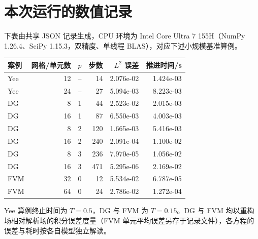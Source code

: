 \section{本次运行的数值记录}
下表由共享 JSON 记录生成，CPU 环境为 Intel Core Ultra 7 155H（NumPy 1.26.4、SciPy 1.15.3，双精度、单线程 BLAS），对应下述小规模基准算例。
\begin{center}\small
\begin{tabular}{lrrrrr}\toprule
案例 & 网格/单元数 & $p$ & 步数 & $L^2$ 误差 & 推进时间/s\\\midrule
Yee & 12 & -- & 14 & 2.076e-02 & 1.424e-03\\
Yee & 24 & -- & 27 & 5.094e-03 & 8.223e-03\\
DG & 8 & 1 & 44 & 2.523e-02 & 2.015e-03\\
DG & 16 & 1 & 87 & 6.550e-03 & 4.003e-03\\
DG & 8 & 2 & 120 & 1.665e-03 & 5.416e-03\\
DG & 16 & 2 & 240 & 2.091e-04 & 1.100e-02\\
DG & 8 & 3 & 236 & 7.970e-05 & 1.056e-02\\
DG & 16 & 3 & 471 & 5.295e-06 & 2.169e-02\\
FVM & 32 & 0 & 12 & 5.534e-02 & 6.787e-05\\
FVM & 64 & 0 & 24 & 2.786e-02 & 1.272e-04\\
\bottomrule\end{tabular}\end{center}
Yee 算例终止时间为 $T=0.5$，DG 与 FVM 为 $T=0.15$。DG 与 FVM 均以重构场相对解析场的积分误差度量（FVM 单元平均误差另存于记录文件），各方程的误差与耗时按各自模型独立解读。
